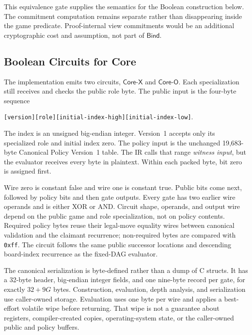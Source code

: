 This equivalence gate supplies the semantics for the Boolean construction
below. The commitment computation remains separate rather than disappearing
inside the game predicate. Proof-internal view commitments would be an
additional cryptographic cost and assumption, not part of
\(\mathsf{Bind}\).

\subsection{Boolean Circuits for Core}

The implementation emits two circuits, \(\mathsf{Core\mbox{-}X}\) and
\(\mathsf{Core\mbox{-}O}\). Each specialization still receives and checks
the public role byte. The public input is the four-byte sequence

\begin{center}
\texttt{[version][role][initial-index-high][initial-index-low]}.
\end{center}

The index is an unsigned big-endian integer. Version~1 accepts only its
specialized role and initial index zero. The policy input is the unchanged
19,683-byte Canonical Policy Version~1 table. The IR calls that range
\emph{witness input}, but the evaluator receives every byte in plaintext.
Within each packed byte, bit zero is assigned first.

Wire zero is constant false and wire one is constant true. Public bits come
next, followed by policy bits and then gate outputs. Every gate has two earlier
wire operands and is either XOR or AND. Circuit shape, operands, and output wire
depend on the public game and role specialization, not on policy contents.
Required policy bytes reuse their legal-move equality wires between canonical
validation and the claimant recurrence; non-required bytes are compared with
\texttt{0xff}. The circuit follows the same public successor locations and
descending board-index recurrence as the fixed-DAG evaluator.

The canonical serialization is byte-defined rather than a dump of C structs.
It has a 32-byte header, big-endian integer fields, and one nine-byte record per
gate, for exactly \(32+9G\) bytes. Construction, evaluation, depth analysis,
and serialization use caller-owned storage. Evaluation uses one byte per wire
and applies a best-effort volatile wipe before returning. That wipe is not a
guarantee about registers, compiler-created copies, operating-system state, or
the caller-owned public and policy buffers.

